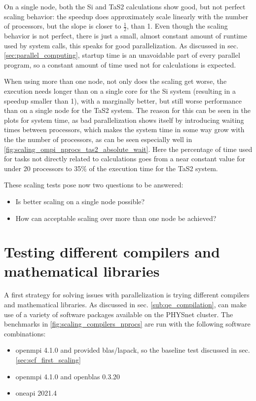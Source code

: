 \documentclass[main.tex]{subfiles}
\begin{document}
On a single node, both the Si and TaS2 calculations show good, but not perfect scaling behavior: the speedup does approximately scale linearly with the number of processors, but the slope is closer to \(\frac{1}{2}\), than 1.
Even though the scaling behavior is not perfect, there is just a small, almost constant amount of runtime used by system calls, this speaks for good parallelization.
As discussed in sec. \ref{sec:parallel_computing}, startup time is an unavoidable part of every parallel program, so a constant amount of time used not for calculations is expected.

When using more than one node, not only does the scaling get worse, the execution needs longer than on a single core for the Si system (resulting in a speedup smaller than 1), with a marginally better, but still worse performance than on a single node for the TaS2 system.
The reason for this can be seen in the plots for system time, as bad parallelization shows itself by introducing waiting times between processors, which makes the system time in some way grow with the the number of processors, as can be seen especially well in \ref{fig:scaling_ompi_nprocs_tas2_absolute_wait}.
Here the percentage of time used for tasks not directly related to calculations goes from a near constant value for under 20 processors to 35\% of the execution time for the TaS2 system.

These scaling tests pose now two questions to be answered:
\begin{itemize}
    \item Is better scaling on a single node possible?
    \item How can acceptable scaling over more than one node be achieved?
\end{itemize}

\section{Testing different compilers and mathematical libraries}

A first strategy for solving issues with parallelization is trying different compilers and mathematical libraries.
As discussed in sec. \ref{sub:qe_compilation}, \QE can make use of a variety of software packages available on the PHYSnet cluster.
The benchmarks in \ref{fig:scaling_compilers_nprocs} are run with the following software combinations:
\begin{itemize}
    \item \gls{openmpi} 4.1.0 and \QE provided \gls{blas}/\gls{lapack}, so the baseline test discussed in sec. \ref{sec:scf_first_scaling}
    \item \gls{openmpi} 4.1.0 and \gls{openblas} 0.3.20
    \item \gls{oneapi} 2021.4
\end{itemize}
\end{document}
